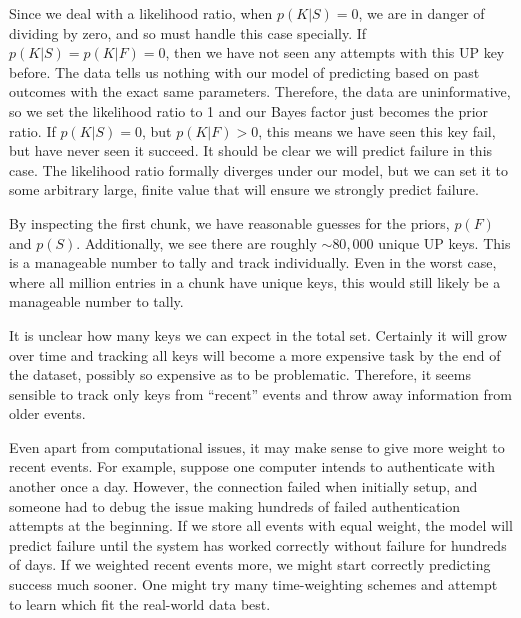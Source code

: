 \documentclass[aps, prd, amsmath, floats, floatfix, superscriptaddress,
nofootinbib,eqsecnum]{revtex4}
\begin{document}
Since we deal with a likelihood ratio, when $p(K|S)=0$, we are in danger of dividing by zero, and so must handle this
case specially. If $p(K|S) = p(K|F) = 0$, then we have not seen any attempts with this UP key before. The data tells
us nothing with our model of predicting based on past outcomes with the exact same parameters. 
Therefore, the data are uninformative, so we set the
likelihood ratio to 1 and our Bayes factor just becomes the prior ratio. If $p(K|S)=0$, but $p(K|F) > 0$, this means we have
seen this key fail, but have never seen it succeed. It should be clear we will predict failure in this case. The likelihood ratio
formally diverges under our model, but we can set it to some arbitrary large, finite value that will ensure we strongly predict
failure.

By inspecting the first chunk, we have reasonable guesses for the priors, $p(F)$ and $p(S)$. Additionally, we see there
are roughly $\sim 80,000$ unique UP keys. This is a manageable number to tally and track individually. Even in the worst case, where all million entries in a chunk have unique keys, this would still likely be a manageable number to tally.

It is unclear how many keys we can expect in the total set. Certainly it will grow over time and tracking all keys will become
a more expensive task by the end of the dataset, possibly so expensive as to be problematic. Therefore, it seems
sensible to track only keys from ``recent'' events and throw away information from older events. 

Even apart from 
computational issues, it may make sense to give more weight to recent events. For example, suppose one computer
intends to authenticate with another once a day. However, the connection failed when initially setup, and someone
had to debug the issue making hundreds of failed authentication attempts at the beginning. If we store all events with
equal weight, the model will predict failure until the system has worked correctly without failure for hundreds of days.
If we weighted recent events more, we might start correctly predicting success much sooner. 
One might try many time-weighting schemes and attempt to learn which fit the real-world data best.


\end{document}
